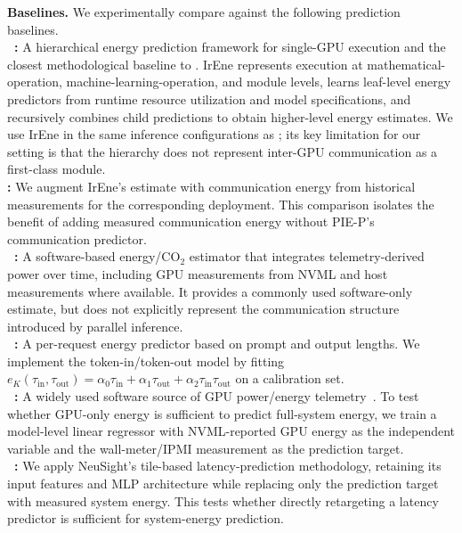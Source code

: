 \smallskip\noindent\textbf{Baselines.} We experimentally compare \sys{} against the following prediction baselines.\\
\noindent\textbf{~\cite{irene}:} A hierarchical energy prediction framework for single-GPU execution and the closest methodological baseline to \sys{}. IrEne represents execution at mathematical-operation, machine-learning-operation, and module levels, learns leaf-level energy predictors from runtime resource utilization and model specifications, and recursively combines child predictions to obtain higher-level energy estimates. We use IrEne in the same inference configurations as \sys{}; its key limitation for our setting is that the hierarchy does not represent inter-GPU communication as a first-class module. \\
\textbf{:} We augment IrEne's estimate with communication energy from historical measurements for the corresponding deployment. This comparison isolates the benefit of adding measured communication energy without PIE-P's communication predictor. \\
\textbf{~\cite{codecarbon}:} A software-based energy/\(\mathrm{CO_2}\) estimator that integrates telemetry-derived power over time, including GPU measurements from NVML and host measurements where available. It provides a commonly used software-only estimate, but does not explicitly represent the communication structure introduced by parallel inference. \\
\textbf{~\cite{wilkins2024offlineenergyoptimalllmserving}:} A per-request energy predictor based on prompt and output lengths. We implement the token-in/token-out model by fitting $e_K(\tau_{\mathrm{in}},\tau_{\mathrm{out}})=\alpha_0\tau_{\mathrm{in}}+\alpha_1\tau_{\mathrm{out}}+\alpha_2\tau_{\mathrm{in}}\tau_{\mathrm{out}}$ on a calibration set. \\
\textbf{~\cite{nvml}:} A widely used software source of GPU power/energy telemetry~\cite{strubell19,luccioni2022estimatingcarbonfootprintbloom,Jesse-dodge-icml}. To test whether GPU-only energy is sufficient to predict full-system energy, we train a model-level linear regressor with NVML-reported GPU energy as the independent variable and the wall-meter/IPMI measurement as the prediction target. \\
\textbf{~\cite{neusight}:} We apply NeuSight's tile-based latency-prediction methodology, retaining its input features and MLP architecture while replacing only the prediction target with measured system energy. This tests whether directly retargeting a latency predictor is sufficient for system-energy prediction.

